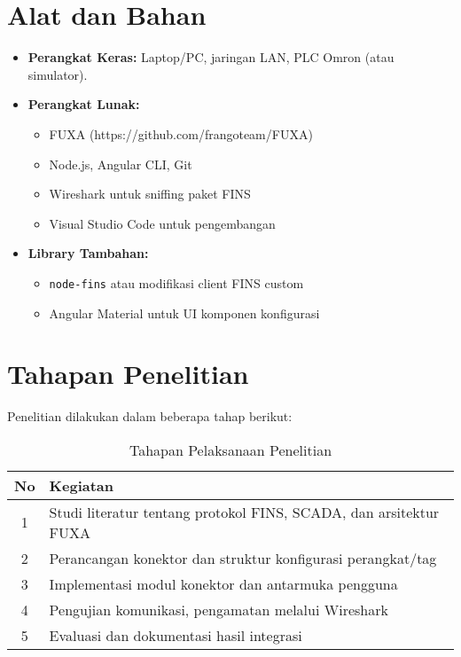 \section{Alat dan Bahan}
\begin{itemize}
    \item \textbf{Perangkat Keras:} Laptop/PC, jaringan LAN, PLC Omron (atau simulator).
    \item \textbf{Perangkat Lunak:} 
    \begin{itemize}
        \item FUXA (https://github.com/frangoteam/FUXA)
        \item Node.js, Angular CLI, Git
        \item Wireshark untuk sniffing paket FINS
        \item Visual Studio Code untuk pengembangan
    \end{itemize}
    \item \textbf{Library Tambahan:} 
    \begin{itemize}
        \item \texttt{node-fins} atau modifikasi client FINS custom
        \item Angular Material untuk UI komponen konfigurasi
    \end{itemize}
\end{itemize}

\section{Tahapan Penelitian}
Penelitian dilakukan dalam beberapa tahap berikut:

\begin{table}[H]
\centering
\begin{tabular}{|c|p{8cm}|}
\hline
\textbf{No} & \textbf{Kegiatan} \\
\hline
1 & Studi literatur tentang protokol FINS, SCADA, dan arsitektur FUXA \\
2 & Perancangan konektor dan struktur konfigurasi perangkat/tag \\
3 & Implementasi modul konektor dan antarmuka pengguna \\
4 & Pengujian komunikasi, pengamatan melalui Wireshark \\
5 & Evaluasi dan dokumentasi hasil integrasi \\
\hline
\end{tabular}
\caption{Tahapan Pelaksanaan Penelitian}
\end{table}

